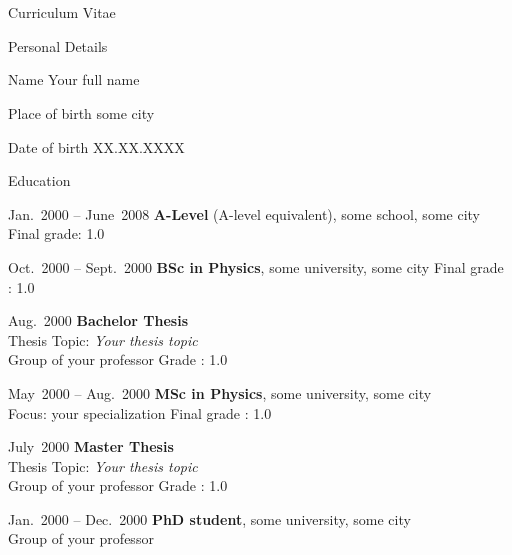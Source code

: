 \setlength{\cvlabelwidth}{40mm}
\chapter*{}
\vspace{-30mm}
\begin{cv}{Curriculum Vitae}
\vspace{5mm}
\begin{cvlist}{Personal Details}
    \item [Name] Your full name
    \item [Place of birth] some city
    \item [Date of birth] XX.XX.XXXX
\end{cvlist}
\vspace{0.5mm}
\begin{cvlist}{Education}
    \item [Jan.~2000 -- June~2008] \textbf{A-Level} (A-level equivalent), some school, some city
                        Final grade: 1.0
    \item [Oct.~2000 -- Sept.~2000] \textbf{BSc in Physics}, some university, some city
                        Final grade : 1.0
    \item [Aug.~2000]          \textbf{Bachelor Thesis}\\
                        Thesis Topic: \textit{Your thesis topic}\\
                        Group of your professor
                        Grade : 1.0
    \item [May~2000 -- Aug.~2000] \textbf{MSc in Physics}, some university, some city\\
                        Focus: your specialization 
                        Final grade : 1.0
    \item [July~2000]          \textbf{Master Thesis}\\
                        Thesis Topic: \textit{Your thesis topic}\\
                        Group of your professor
                        Grade : 1.0
    \item [Jan.~2000 -- Dec.~2000] \textbf{PhD student}, some university, some city \\
                        Group of your professor

\end{cvlist}
\date{}
\end{cv}
